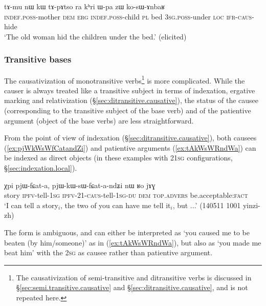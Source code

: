 \begin{exe}
\ex \label{ex:kosAnbaR}
\gll tɤ-mu nɯ kɯ  tɤ-pɤtso ra kʰri ɯ-pa zɯ ko-sɯ-ɤnbaʁ  \\
\textsc{indef}.\textsc{poss}-mother \textsc{dem} \textsc{erg} \textsc{indef}.\textsc{poss}-child \textsc{pl} bed \textsc{3sg}.\textsc{poss}-under \textsc{loc} \textsc{ifr}-\textsc{caus}-hide \\
\glt `The old woman hid the children under the bed.' (elicited)
\end{exe}

\subsubsection{Transitive bases} \label{sec:sig.caus.tr}
 
The causativization of monotransitive verbs\footnote{The causativization of semi-transitive and ditransitive verbs is discussed in §\ref{sec:semi.transitive.causative} and §\ref{sec:ditransitive.causative}, and is not repeated here. } is more complicated. While the causer is always treated like a transitive subject in terms of indexation, ergative marking and relativization (§\ref{sec:ditransitive.causative}), the status of the causee (corresponding to the transitive subject of the base verb) and of the patientive argument (object of the base verbs) are less straightforward.

From the point of view of indexation (§\ref{sec:ditransitive.causative}), both causees (\ref{ex:pjWkWsWfCatandZi}) and patientive arguments (\ref{ex:tAkWsWRndWa}) can be indexed as direct objects (in these examples with 2\fl{}\textsc{1sg} configurations, §\ref{sec:indexation.local}).  
 
\begin{exe}
\ex \label{ex:pjWkWsWfCatandZi}
\gll  χpi pjɯ-fɕat-a, pjɯ-kɯ-sɯ-fɕat-a-ndʑi nɯ ʁo jɤɣ \\
story \textsc{ipfv}-tell-\textsc{1sg} \textsc{ipfv}-2\fl{}1-\textsc{caus}-tell-\textsc{1sg}-\textsc{du} \textsc{dem} \textsc{top}.\textsc{advers} be.acceptable:\textsc{fact} \\
\glt `I can tell a story$_i$, the two of you can have me tell it$_i$, but ...' (140511 1001 yinzi-zh)
\end{exe}

The form  is ambiguous, and can either be interpreted as `you caused me to be beaten (by him/someone)' as in (\ref{ex:tAkWsWRndWa}), but also as `you made me beat him' with the \textsc{2sg} as causee rather than patientive argument.
 
